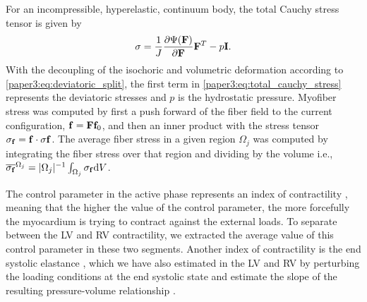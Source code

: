 For an incompressible, hyperelastic, continuum body, the total Cauchy
stress tensor is given by
\begin{align}
  \mathbf{\sigma} = \frac{1}{J} \frac{\partial \Psi(\mathbf{F})}{\partial \mathbf{F}} \mathbf{F}^T - p\mathbf{I}.
  \label{paper3:eq:total_cauchy_stress}
\end{align}
With the decoupling of the isochoric and volumetric deformation
according to \eqref{paper3:eq:deviatoric_split},
the first term in \eqref{paper3:eq:total_cauchy_stress} represents the
deviatoric stresses and $p$ is the hydrostatic pressure. Myofiber
stress was computed by first a push forward of the fiber field to the current
configuration, $\mathbf{f} = \mathbf{F} \mathbf{f}_0$, and then an inner
product with the stress tensor $\mathbf{\sigma}_{\mathbf{f}} = \mathbf{f}
\cdot \mathbf{\sigma} \mathbf{f}$. The average fiber stress in a given region
$\Omega_j$ was computed by integrating the fiber stress over that
region and dividing by the volume i.e.,
$\overline{\mathbf{\sigma}_{\mathbf{f}}}^{\Omega_j} = | \Omega_j |^{-1}
\int_{\Omega_j} \mathbf{\sigma}_{\mathbf{f}} \mathrm{d} V$.

The control parameter in the active phase represents an index of
contractility \citep{finsberg2017estimating}, meaning that the higher
the value of the control parameter, the more forcefully the myocardium is
trying to contract against the external loads. To separate between the LV and
RV contractility, we extracted the average value of this control parameter in these
two segments. Another index of contractility is the end systolic
elastance \citep{sagawa1977end}, which we have also estimated in the LV and
RV by perturbing the loading conditions at the end systolic state and
estimate the slope of the resulting pressure-volume
relationship \citep{finsberg2017estimating}.


